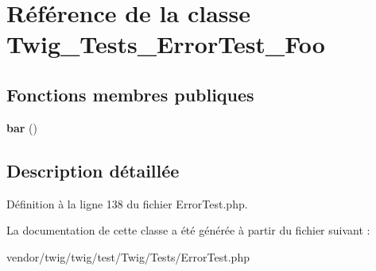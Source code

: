 \hypertarget{class_twig___tests___error_test___foo}{}\section{Référence de la classe Twig\+\_\+\+Tests\+\_\+\+Error\+Test\+\_\+\+Foo}
\label{class_twig___tests___error_test___foo}
\subsection*{Fonctions membres publiques}
\begin{DoxyCompactItemize}
\item 
{\bfseries bar} ()\hypertarget{class_twig___tests___error_test___foo_ad2e199af8a32cd5a9a5ba591aac8431c}{}\label{class_twig___tests___error_test___foo_ad2e199af8a32cd5a9a5ba591aac8431c}

\end{DoxyCompactItemize}


\subsection{Description détaillée}


Définition à la ligne 138 du fichier Error\+Test.\+php.



La documentation de cette classe a été générée à partir du fichier suivant \+:\begin{DoxyCompactItemize}
\item 
vendor/twig/twig/test/\+Twig/\+Tests/Error\+Test.\+php\end{DoxyCompactItemize}
